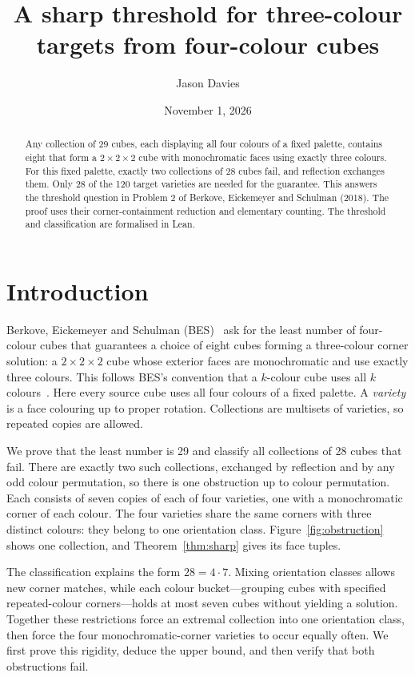 \documentclass[11pt]{article}
\title{A sharp threshold for three-colour targets from four-colour cubes}
\author{Jason Davies}
\date{November 1, 2026}
\theoremstyle{remark}
\begin{document}
\maketitle

\begin{abstract}
Any collection of 29 cubes, each displaying all four colours of a fixed
palette, contains eight that form a $2\times2\times2$ cube with monochromatic
faces using exactly three colours. For this fixed palette, exactly two
collections of 28 cubes fail, and reflection exchanges them. Only 28 of the
120 target varieties are needed for the guarantee. This answers
the threshold question in Problem 2 of Berkove, Eickemeyer and Schulman
(2018). The proof uses their corner-containment reduction and elementary
counting. The threshold and classification are formalised in Lean.
\end{abstract}

\section{Introduction}
Berkove, Eickemeyer and Schulman (BES)~\cite[Problem 2]{BES} ask for the
least number of four-colour cubes that guarantees a choice of eight cubes
forming a three-colour corner solution: a $2\times2\times2$ cube whose
exterior faces are monochromatic and use exactly three colours.
This follows BES's convention that a $k$-colour cube uses all $k$
colours~\cite[Section 1, opening definition]{BES}.
Here every source cube uses all four colours of a fixed palette. A
\emph{variety} is a face colouring up to proper rotation.
Collections are multisets of varieties, so repeated copies
are allowed.

We prove that the least number is 29 and classify all collections of
28 cubes that fail. There are exactly two such collections, exchanged by
reflection and by any odd colour permutation, so there is one obstruction
up to colour permutation. Each consists of seven copies of each of four
varieties, one with a monochromatic corner of each colour. The four varieties
share the same corners with three distinct colours: they belong to one
orientation class. Figure~\ref{fig:obstruction} shows one collection, and
Theorem~\ref{thm:sharp} gives its face tuples.

The classification explains the form $28=4\cdot7$. Mixing orientation classes
allows new corner matches, while each colour bucket---grouping cubes with
specified repeated-colour corners---holds at most seven cubes without
yielding a solution. Together these restrictions force an
extremal collection into one orientation class, then force the four
monochromatic-corner varieties to occur equally often. We first prove this
rigidity, deduce the upper bound, and then verify that both obstructions fail.
\end{document}
